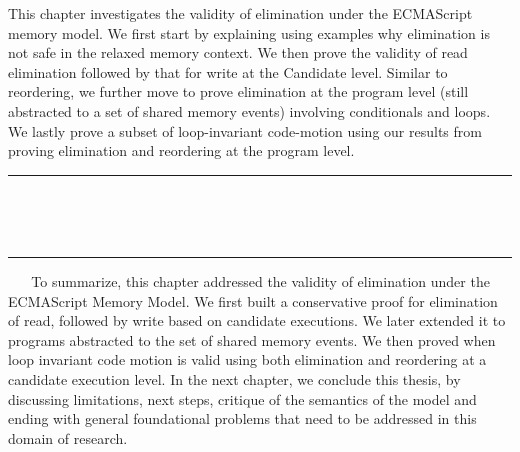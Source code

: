 This chapter investigates the validity of elimination under the ECMAScript memory model.
We first start by explaining using examples why elimination is not safe in the relaxed memory context.   
We then prove the validity of read elimination followed by that for write at the Candidate level. 
Similar to reordering, we further move to prove elimination at the program level (still abstracted to a set of shared memory events) involving conditionals and loops.
We lastly prove a subset of loop-invariant code-motion using our results from proving elimination and reordering at the program level. 
\ \newline
\ \newline  
\hrule 
\ \newline 
\ \newline 






 

  
\ \newline
\ \newline  
\hrule 
\ \newline 
\ \newline 
To summarize, this chapter addressed the validity of elimination under the ECMAScript Memory Model. 
We first built a conservative proof for elimination of read, followed by write based on candidate executions.
We later extended it to programs abstracted to the set of shared memory events. 
We then proved when loop invariant code motion is valid using both elimination and reordering at a candidate execution level. 
In the next chapter, we conclude this thesis, by discussing limitations, next steps, critique of the semantics of the model and ending with general foundational problems that need to be addressed in this domain of research. 